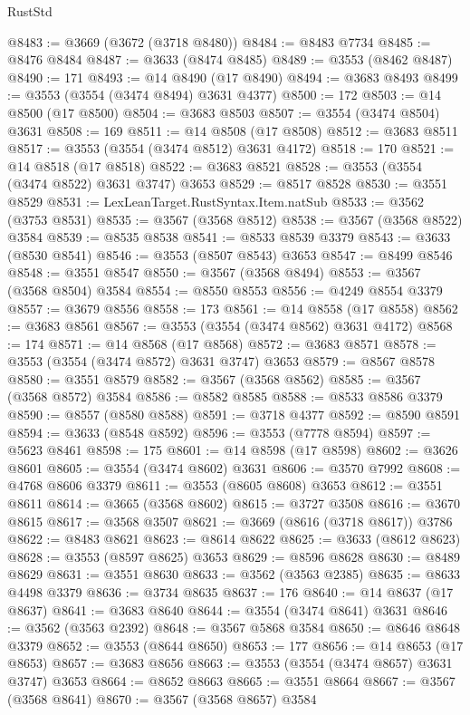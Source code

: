 \begin{lexlean}{RustStd}
\begin{coremodule}
@8483 := @3669 (@3672 (@3718 @8480))
@8484 := @8483 @7734
@8485 := @8476 @8484
@8487 := @3633 (@8474 @8485)
@8489 := @3553 (@8462 @8487)
@8490 := 171
@8493 := @14 @8490 (@17 @8490)
@8494 := @3683 @8493
@8499 := @3553 (@3554 (@3474 @8494) @3631 @4377)
@8500 := 172
@8503 := @14 @8500 (@17 @8500)
@8504 := @3683 @8503
@8507 := @3554 (@3474 @8504) @3631
@8508 := 169
@8511 := @14 @8508 (@17 @8508)
@8512 := @3683 @8511
@8517 := @3553 (@3554 (@3474 @8512) @3631 @4172)
@8518 := 170
@8521 := @14 @8518 (@17 @8518)
@8522 := @3683 @8521
@8528 := @3553 (@3554 (@3474 @8522) @3631 @3747) @3653
@8529 := @8517 @8528
@8530 := @3551 @8529
@8531 := LexLeanTarget.RustSyntax.Item.natSub
@8533 := @3562 (@3753 @8531)
@8535 := @3567 (@3568 @8512)
@8538 := @3567 (@3568 @8522) @3584
@8539 := @8535 @8538
@8541 := @8533 @8539 @3379
@8543 := @3633 (@8530 @8541)
@8546 := @3553 (@8507 @8543) @3653
@8547 := @8499 @8546
@8548 := @3551 @8547
@8550 := @3567 (@3568 @8494)
@8553 := @3567 (@3568 @8504) @3584
@8554 := @8550 @8553
@8556 := @4249 @8554 @3379
@8557 := @3679 @8556
@8558 := 173
@8561 := @14 @8558 (@17 @8558)
@8562 := @3683 @8561
@8567 := @3553 (@3554 (@3474 @8562) @3631 @4172)
@8568 := 174
@8571 := @14 @8568 (@17 @8568)
@8572 := @3683 @8571
@8578 := @3553 (@3554 (@3474 @8572) @3631 @3747) @3653
@8579 := @8567 @8578
@8580 := @3551 @8579
@8582 := @3567 (@3568 @8562)
@8585 := @3567 (@3568 @8572) @3584
@8586 := @8582 @8585
@8588 := @8533 @8586 @3379
@8590 := @8557 (@8580 @8588)
@8591 := @3718 @4377
@8592 := @8590 @8591
@8594 := @3633 (@8548 @8592)
@8596 := @3553 (@7778 @8594)
@8597 := @5623 @8461
@8598 := 175
@8601 := @14 @8598 (@17 @8598)
@8602 := @3626 @8601
@8605 := @3554 (@3474 @8602) @3631
@8606 := @3570 @7992
@8608 := @4768 @8606 @3379
@8611 := @3553 (@8605 @8608) @3653
@8612 := @3551 @8611
@8614 := @3665 (@3568 @8602)
@8615 := @3727 @3508
@8616 := @3670 @8615
@8617 := @3568 @3507
@8621 := @3669 (@8616 (@3718 @8617)) @3786
@8622 := @8483 @8621
@8623 := @8614 @8622
@8625 := @3633 (@8612 @8623)
@8628 := @3553 (@8597 @8625) @3653
@8629 := @8596 @8628
@8630 := @8489 @8629
@8631 := @3551 @8630
@8633 := @3562 (@3563 @2385)
@8635 := @8633 @4498 @3379
@8636 := @3734 @8635
@8637 := 176
@8640 := @14 @8637 (@17 @8637)
@8641 := @3683 @8640
@8644 := @3554 (@3474 @8641) @3631
@8646 := @3562 (@3563 @2392)
@8648 := @3567 @5868 @3584
@8650 := @8646 @8648 @3379
@8652 := @3553 (@8644 @8650)
@8653 := 177
@8656 := @14 @8653 (@17 @8653)
@8657 := @3683 @8656
@8663 := @3553 (@3554 (@3474 @8657) @3631 @3747) @3653
@8664 := @8652 @8663
@8665 := @3551 @8664
@8667 := @3567 (@3568 @8641)
@8670 := @3567 (@3568 @8657) @3584

\end{coremodule}
\end{lexlean}
